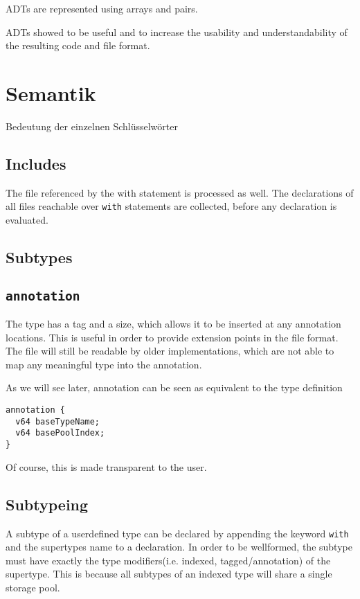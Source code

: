 \documentclass[a4paper,10pt]{article}
\begin{document}
ADTs are represented using arrays and pairs.

ADTs showed to be useful and to increase the usability and understandability of the resulting code and file format.

\section{Semantik}

Bedeutung der einzelnen Schlüsselwörter

\subsection{Includes}
The file referenced by the with statement is processed as well. The declarations of all files reachable over \texttt{with} statements are collected, before any declaration is evaluated.

\subsection{Subtypes}

\subsection{\texttt{annotation}}
The type has a tag and a size, which allows it to be inserted at any annotation locations. This is useful in order to provide extension points in the file format. The file will still be readable by older implementations, which are not able to map any meaningful type into the annotation.

As we will see later, annotation can be seen as equivalent to the type definition
\begin{verbatim}
annotation {
  v64 baseTypeName;
  v64 basePoolIndex;
}
\end{verbatim}
Of course, this is made transparent to the user.

\subsection{Subtypeing}
A subtype of a userdefined type can be declared by appending the keyword \texttt{with} and the supertypes name to a declaration. In order to be wellformed, the subtype must have exactly the type modifiers(i.e. indexed, tagged/annotation) of the supertype. This is because all subtypes of an indexed type will share a single storage pool.
\end{document}
